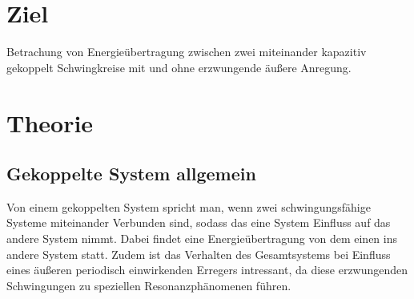 \newpage
\section*{Ziel}
Betrachung von Energieübertragung zwischen zwei miteinander kapazitiv 
gekoppelt Schwingkreise mit und ohne erzwungende äußere Anregung.
\section{Theorie}
\subsection{Gekoppelte System allgemein}
Von einem gekoppelten System spricht man, wenn zwei schwingungsfähige Systeme miteinander
Verbunden sind, sodass das eine System Einfluss auf das andere System nimmt. Dabei 
findet eine Energieübertragung von dem einen ins andere System statt.
Zudem ist das Verhalten des Gesamtsystems bei Einfluss eines äußeren periodisch einwirkenden 
Erregers intressant, da diese erzwungenden Schwingungen zu speziellen Resonanzphänomenen
führen.
